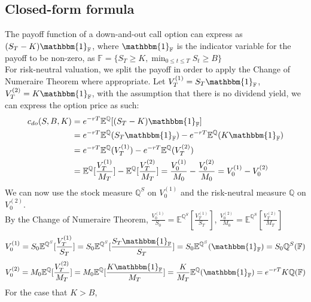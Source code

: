 \subsection{Closed-form formula}
The payoff function of a down-and-out call option can express as $(S_{T} - K)\mathbbm{1}_{\mathbb{F}}$, where $\mathbbm{1}_{\mathbb{F}}$ is the indicator variable for the payoff to be non-zero, as $\displaystyle \mathbb{F} = \{ S_{T} \ge K, \min_{0 \le t \le T} S_{t} \ge B \}$\\[1mm]
For risk-neutral valuation, we split the payoff in order to apply the Change of Numeraire Theorem where appropriate. Let $V_{T}^{(1)} = S_{T}\mathbbm{1}_{\mathbb{F}}$, $V_{T}^{(2)} =  K\mathbbm{1}_{\mathbb{F}}$, with the assumption that there is no dividend yield, we can express the option price as such:
\begin{equation*}
\begin{split}
c_{do}(S, B, K)
&= e^{-rT}\mathbb{E}^{\mathbb{Q}}[(S_{T} - K)\mathbbm{1}_{\mathbb{F}}]\\
&= e^{-rT}\mathbb{E}^{\mathbb{Q}}(S_{T}\mathbbm{1}_{\mathbb{F}}) - e^{-rT}\mathbb{E}^{\mathbb{Q}}(K\mathbbm{1}_{\mathbb{F}})\\
&= e^{-rT}\mathbb{E}^{\mathbb{Q}}(V_{T}^{(1)}) - e^{-rT}\mathbb{E}^{\mathbb{Q}}(V_{T}^{(2)})\\
&= \mathbb{E}^{\mathbb{Q}}[\frac{V_{T}^{(1)}}{M_{T}}] - \mathbb{E}^{\mathbb{Q}}[\frac{V_{T}^{(2)}}{M_{T}}] = \frac{V_{0}^{(1)}}{M_{0}} - \frac{V_{0}^{(2)}}{M_{0}} = V_{0}^{(1)} - V_{0}^{(2)}
\end{split}
\end{equation*}
We can now use the stock measure $\mathbb{Q}^{S}$ on $V_{0}^{(1)}$ and the risk-neutral measure $\mathbb{Q}$ on $V_{0}^{(2)}$.\\
By the Change of Numeraire Theorem, $\frac{V_{0}^{(1)}}{S_{0}} = \mathbb{E}^{\mathbb{Q}^{S}}[\frac{V_{T}^{(1)}}{S_{T}}]$, $\frac{V_{0}^{(2)}}{M_{0}} = \mathbb{E}^{\mathbb{Q}^{S}}[\frac{V_{T}^{(2)}}{M_{T}}]$\\
$$V_{0}^{(1)} = S_{0}\mathbb{E}^{\mathbb{Q}^{S}}[\frac{V_{T}^{(1)}}{S_{T}}] = S_{0}\mathbb{E}^{\mathbb{Q}^{S}}[\frac{S_{T}\mathbbm{1}_{\mathbb{F}}}{S_{T}}] = S_{0}\mathbb{E}^{\mathbb{Q}^{S}}(\mathbbm{1}_{\mathbb{F}}) = S_{0}\mathbb{Q}^{S}({\mathbb{F}})$$
$$V_{0}^{(2)} = M_{0}\mathbb{E}^{\mathbb{Q}}[\frac{V_{T}^{(2)}}{M_{T}}] = M_{0}\mathbb{E}^{\mathbb{Q}}[\frac{K\mathbbm{1}_{\mathbb{F}}}{M_{T}}] = \frac{K}{M_{T}}\mathbb{E}^{\mathbb{Q}}(\mathbbm{1}_{\mathbb{F}}) = e^{-rT}K\mathbb{Q}({\mathbb{F}})$$
For the case that $K > B$,
